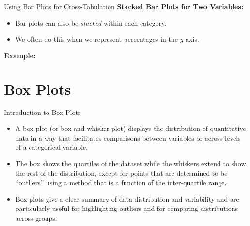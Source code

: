 \documentclass[handout]{beamer} %
\begin{document}
\begin{frame}{Using Bar Plots for Cross-Tabulation}
    \textbf{Stacked Bar Plots for Two Variables:}
    \begin{itemize}
        \item Bar plots can also be \emph{stacked} within each category.
        \item We often do this when we represent percentages in the $y$-axis.
    \end{itemize}
    
    \textbf{Example:}
    \begin{center}
    \end{center}

\end{frame}

\section{Box Plots}

\begin{frame}{Introduction to Box Plots}
    \begin{itemize}
        \item A box plot (or box-and-whisker plot) displays the distribution of quantitative data in a way that facilitates comparisons between variables or across levels of a categorical variable.
        \item The box shows the quartiles of the dataset while the whiskers extend to show the rest of the distribution, except for points that are determined to be “outliers” using a method that is a function of the inter-quartile range.
        \item Box plots give a clear summary of data distribution and variability and are particularly useful for highlighting outliers and for comparing distributions across groups.
    \end{itemize}
\end{frame}
\end{document}

